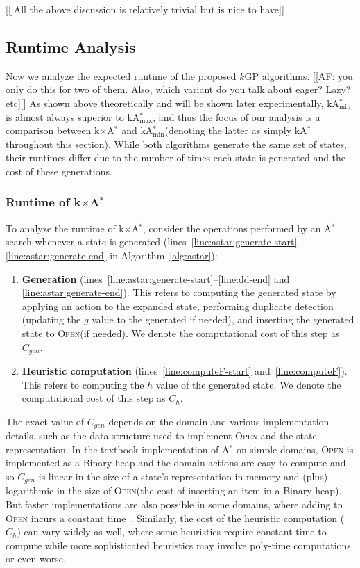 \documentclass[twoside,11pt]{article}
\newcommand{\kgs}{$k$GP\xspace}
\newcommand{\astar}{A$^*$\xspace}
\newcommand{\kastar}{kA$^*$\xspace}
\newcommand{\kastarvar}[1]{\textup{kA}$^*_{#1}$\xspace}
\newcommand{\kastarmin}{\kastarvar{\min}}
\newcommand{\kastarmax}{\kastarvar{\max}}
\newcommand{\kxastar}{k$\times$A$^*$\xspace}
\newcommand{\open}{\textsc{Open}\xspace}
\begin{document}
[[]All the above discussion is relatively trivial but is nice to have]]


\subsection{Runtime Analysis}

Now we analyze the expected runtime of the proposed \kgs algorithms. [[AF: you only do this for two of them. Also, which variant do you talk about eager? Lazy? etc][]
As shown above theoretically and will be shown later experimentally, \kastarmin is almost always superior to \kastarmax, and thus the focus of our analysis is a comparison between \kxastar and \kastarmin (denoting the latter as simply \kastar throughout this section). 
While both algorithms generate the same set of states, %
their runtimes differ due to the number of times each state is generated and the cost of these generations.



\subsubsection{Runtime of \kxastar}
To analyze the runtime of \kxastar, consider the operations performed by an \astar search whenever a state is generated (lines~\ref{line:astar:generate-start}--\ref{line:astar:generate-end} in Algorithm~\ref{alg:astar}):

\begin{enumerate}
  \item \textbf{Generation}  (lines~\ref{line:astar:generate-start}--\ref{line:dd-end} and \ref{line:astar:generate-end}).
  This refers to computing the generated state by applying an action to the expanded state, performing duplicate detection (updating the $g$ value to the generated if needed), and inserting the generated state to \open (if needed).
  We denote the computational cost of this step as $C_{gen}$.

  \item \textbf{Heuristic computation}  (lines~\ref{line:computeF-start} and~\ref{line:computeF}).
  This refers to computing the $h$ value of the generated state.
  We denote the computational cost of this step as $C_{h}$.
\end{enumerate}

The exact value of $C_{gen}$ depends on the domain and various implementation details, such as the data structure used to implement \open and the state representation.
In the textbook implementation of \astar on simple domains, \open is implemented as a Binary heap and the domain actions are easy to compute and so $C_{gen}$ is linear in the size of a state's representation in memory and (plus) logarithmic in the size of \open (the cost of inserting an item in a Binary heap).
But faster implementations are also possible in some domains, where adding to \open incurs a constant time~\cite{GILON2016,BurnsHLR12}.
Similarly, the cost of the heuristic computation ($C_h$) can vary widely as well, where some heuristics require constant time to compute while more sophisticated heuristics may involve poly-time computations or even worse.
\end{document}
